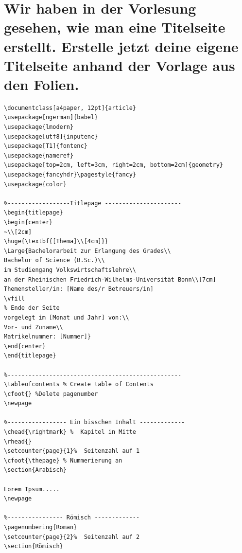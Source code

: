 \section{Wir haben in der Vorlesung gesehen, wie man eine Titelseite erstellt. Erstelle jetzt deine eigene Titelseite anhand der Vorlage aus den Folien. }

\begin{Antwort}
\begin{lstlisting}[style=latex]
\documentclass[a4paper, 12pt]{article}
\usepackage[ngerman]{babel}
\usepackage{lmodern}
\usepackage[utf8]{inputenc}
\usepackage[T1]{fontenc}
\usepackage{nameref}
\usepackage[top=2cm, left=3cm, right=2cm, bottom=2cm]{geometry}
\usepackage{fancyhdr}\pagestyle{fancy}
\usepackage{color}

%------------------Titlepage ----------------------
\begin{titlepage}
\begin{center}
~\\[2cm]
\huge{\textbf{[Thema]\\[4cm]}}
\Large{Bachelorarbeit zur Erlangung des Grades\\
Bachelor of Science (B.Sc.)\\
im Studiengang Volkswirtschaftslehre\\
an der Rheinischen Friedrich-Wilhelms-Universität Bonn\\[7cm]
Themensteller/in: [Name des/r Betreuers/in]
\vfill
% Ende der Seite
vorgelegt im [Monat und Jahr] von:\\
Vor- und Zuname\\
Matrikelnummer: [Nummer]}
\end{center}
\end{titlepage}

%--------------------------------------------------
\tableofcontents % Create table of Contents
\cfoot{} %Delete pagenumber
\newpage

%----------------- Ein bisschen Inhalt -------------
\chead{\rightmark} %  Kapitel in Mitte
\rhead{}
\setcounter{page}{1}%  Seitenzahl auf 1
\cfoot{\thepage} % Nummerierung an
\section{Arabisch}

Lorem Ipsum..... 
\newpage

%---------------- Römisch -------------
\pagenumbering{Roman}
\setcounter{page}{2}%  Seitenzahl auf 2
\section{Römisch}


\end{lstlisting}
\end{Antwort}
